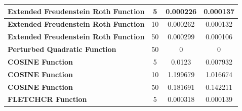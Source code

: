 \documentclass{article}
\begin{document}
\begin{table}[H]
\begin{tabular}{|l|c|c|c|}
		\multicolumn{1}{|c|}{\textbf{Extended Freudenstein Roth Function}} & 5                      & 0.000226                                                                                          & 0.000137                                                                                      \\ \hline
		\multicolumn{1}{|c|}{\textbf{Extended Freudenstein Roth Function}} & 10                     & 0.000262                                                                                          & 0.000132                                                                                      \\ \hline
		\textbf{Extended Freudenstein Roth Function}                       & 50                     & 0.000299                                                                                          & 0.000106                                                                                      \\ \hline
		\textbf{Perturbed Quadratic Function}                              & 50                     & 0                                                                                                 & 0                                                                                             \\ \hline
		\textbf{COSINE Function}                                           & 5                      & 0.0123                                                                                            & 0.007932                                                                                      \\ \hline
		\textbf{COSINE Function}                                           & 10                     & 1.199679                                                                                          & 1.016674                                                                                      \\ \hline
		\textbf{COSINE Function}                                           & 50                     & 0.181691                                                                                          & 0.142211                                                                                      \\ \hline
		\textbf{FLETCHCR Function}                                         & 5                      & 0.000318                                                                                          & 0.000139                                                                                      \\ \hline

\end{tabular}
\end{table}
\end{document}
